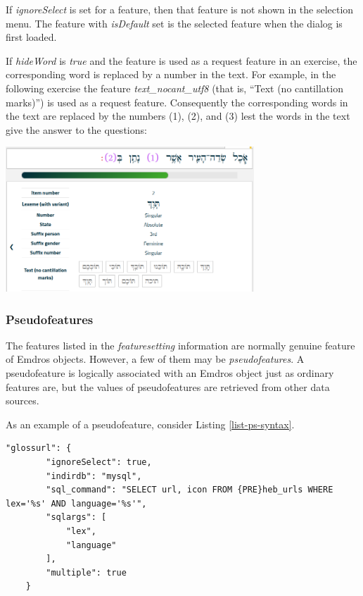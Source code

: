 \documentclass[11pt,oneside,a4paper]{memoir}
\begin{document}
If \emph{ignoreSelect} is set for a feature, then that feature is not shown in the selection menu.
The feature with \emph{isDefault} set is the selected feature when the dialog is first loaded.

If \emph{hideWord} is \emph{true} and the feature is used as a request feature%
in an exercise, the corresponding word is replaced by a number in the text. For example,
in the following exercise the feature \emph{text\_nocant\_utf8} (that is, ``Text (no cantillation
marks)'') is used as a request feature. Consequently the corresponding words in the text are
replaced by the numbers (1), (2), and (3) lest the words in the text give the answer to the
questions:


\begin{center}
  \includegraphics[width=0.7\textwidth]{numbers.png}
\end{center}

\subsubsection{Pseudofeatures}\label{sec-pseudofeature}

The features listed in the \emph{featuresetting} information are normally genuine feature of Emdros
objects. However, a few of them may be \emph{pseudofeatures}. A pseudofeature is logically
associated with an Emdros object just as ordinary features are, but the values of pseudofeatures are
retrieved from other data sources.

As an example of a pseudofeature, consider Listing \ref{list-ps-syntax}.

\begin{lstlisting}[escapechar=\#,caption=Featuresetting syntax for a pseudofeature,label=list-ps-syntax]
    "glossurl": {
        "ignoreSelect": true,
        "indirdb": "mysql",
        "sql_command": "SELECT url, icon FROM {PRE}heb_urls WHERE lex='%s' AND language='%s'",
        "sqlargs": [
            "lex",
            "language"
        ],
        "multiple": true
    }
\end{lstlisting}
\end{document}
